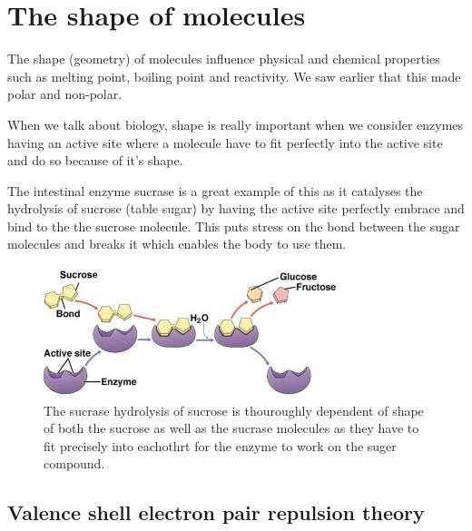 \documentclass[../mit-general-chemistry.tex]{subfiles}
\begin{document}
\chapter{The shape of molecules}

The shape (geometry) of molecules influence physical and chemical
properties such as melting point, boiling point and reactivity. We saw
earlier that this made  polar and  non-polar.

When we talk about biology, shape is really important when we consider
enzymes having an active site where a molecule have to fit perfectly
into the active site and do so because of it's shape.

\begin{example}
  The intestinal enzyme sucrase is a great example of this as it
  catalyses the hydrolysis of sucrose (table sugar) by having the active
  site perfectly embrace and bind to the the sucrose molecule. This puts
  stress on the bond between the sugar molecules and breaks it which
  enables the body to use them.
\end{example}

\begin{figure}[t]
  \begin{margincap}
    \begin{center}
      \includegraphics[width=.85\textwidth]{sucrase}
      \caption{
        The sucrase hydrolysis of sucrose is thouroughly dependent of
        shape of both the sucrose as well as the sucrase molecules as
        they have to fit precisely into eachothrt for the enzyme to
        work on the suger compound.
      }
    \end{center}
  \end{margincap}
\end{figure}







\section{Valence shell electron pair repulsion theory}
\end{document}
